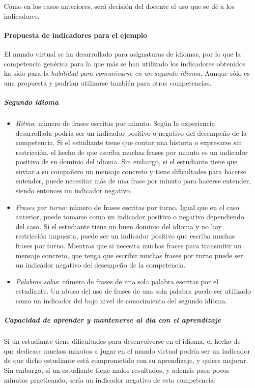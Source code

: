 			Como en los casos anteriores, será decisión del docente el uso que se dé a los indicadores.

			\paragraph*{Propuesta de indicadores para el ejemplo}

			El mundo virtual se ha desarrollado para asignaturas de idiomas, por lo que la competencia genérica para la que más se han utilizado los indicadores obtenidos ha sido para la \emph{habilidad para comunicarse en un segundo idioma}. Aunque sólo es una propuesta y podrían utilizarse también para otras competencias.


			\subparagraph*{Segundo idioma}
\begin{itemize}
\item \emph{Ritmo}: número de frases escritas por minuto. Según la experiencia desarrollada podría ser un indicador positivo o negativo del desempeño de la competencia. Si el estudiante tiene que contar una historia o expresarse sin restricción, el hecho de que escriba muchas frases por minuto es un indicador positivo de su dominio del idioma. Sin embargo, si el estudiante tiene que enviar a su compañero un mensaje concreto y tiene dificultades  para hacerse entender, puede necesitar más de una frase por minuto para hacerse entender, siendo entonces un indicador negativo.
\item \emph{Frases por turno}: número de frases escritas por turno. Igual que en el caso anterior, puede tomarse como un indicador positivo o negativo dependiendo del caso. Si el estudiante tiene un buen dominio del idioma y no hay restricción impuesta, puede ser un indicador positivo que escriba muchas frases por turno. Mientras que si necesita muchas frases para transmitir un mensaje concreto, que tenga que escribir muchas frases por turno puede ser un indicador negativo del desempeño de la competencia.
\item \emph{Palabras solas}: número de frases de una sola palabra escritas por el estudiante. Un abuso del uso de frases de una sola palabra puede ser utilizado como un indicador del bajo nivel de conocimiento del segundo idioma.
\end{itemize}

			\subparagraph*{Capacidad de aprender y mantenerse al día con el aprendizaje}
			Si un estudiante tiene dificultades para desenvolverse en el idioma, el hecho de que dedicase muchos minutos a jugar en el mundo virtual podría ser un indicador de que dicho estudiante está comprometido con su aprendizaje, y quiere mejorar. Sin embargo, si un estudiante tiene malos resultados, y además pasa pocos minutos practicando, sería un indicador negativo de esta competencia.

